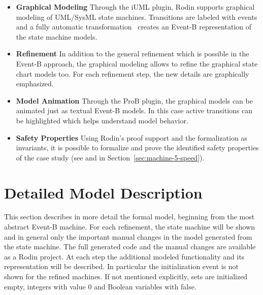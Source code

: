 \documentclass{template/openetcs_article}
\begin{document}
\begin{itemize}
\item {\bf Graphical Modeling} Through the iUML plugin, Rodin supports graphical
  modeling of UML/SysML state machines. Transitions are labeled with events and
  a fully automatic transformation~\cite{said2009language} creates an Event-B
  representation of the state machine models.
\item {\bf Refinement} In addition to the general refinement which is possible
  in the Event-B approach, the graphical modeling allows to refine the graphical
  state chart models too. For each refinement step, the new details are
  graphically emphasized.
\item {\bf Model Animation} Through the ProB plugin, the graphical models can be
  animated just as textual Event-B models. In this case active transitions can
  be highlighted which helps understand model behavior.
\item {\bf Safety Properties} Using Rodin's proof support and the formalization
  as invariants, it is possible to formalize and prove the identified safety
  properties of the case study (see  and  in
  Section~\ref{sec:machine-5-speed}).
\end{itemize}

\section{Detailed Model Description}
\label{sec:deta-model-descr}

This section describes in more detail the formal model, beginning from the most
abstract Event-B machine.  For each refinement, the state machine will be shown
and in general only the important manual changes in the model generated from the
state machine. The full generated code and the manual changes are available as a
Rodin project. At each step the additional modeled functionality and its
representation will be described. In particular the initialization event is not
shown for the refined machines. If not mentioned explicitly, sets are
initialized empty, integers with value 0 and Boolean variables with false.
\end{document}
